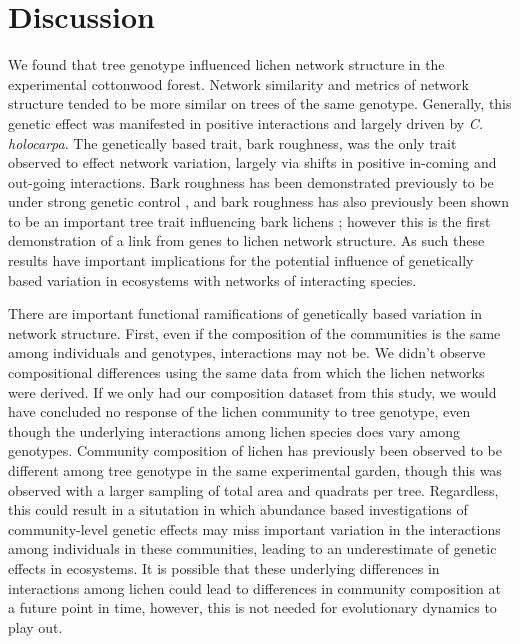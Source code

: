 \documentclass[11pt,twocolumn,twoside,lineno]{pnas-new}
\begin{document}


\section*{Discussion}


We found that tree genotype influenced lichen network structure in the
experimental cottonwood forest. Network similarity and metrics of
network structure tended to be more similar on trees of the same
genotype. Generally, this genetic effect was manifested in positive
interactions and largely driven by \textit{C. holocarpa}. The
genetically based trait, bark roughness, was the only trait observed
to effect network variation, largely via shifts in positive in-coming
and out-going interactions. Bark roughness has been demonstrated
previously to be under strong genetic control \cite{Bdeir2017}, and
bark roughness has also previously been shown to be an important tree
trait influencing bark lichens \cite{Lamit2015a}; however this is the
first demonstration of a link from genes to lichen network structure.
As such these results have important implications for the potential
influence of genetically based variation in ecosystems with networks
of interacting species.

There are important functional ramifications of genetically based
variation in network structure. First, even if the composition of the
communities is the same among individuals and genotypes, interactions
may not be. We didn't observe compositional differences using the same
data from which the lichen networks were derived. If we only had our
composition dataset from this study, we would have concluded no
response of the lichen community to tree genotype, even though the
underlying interactions among lichen species does vary among
genotypes. Community composition of lichen has previously been
observed to be different among tree genotype in the same experimental
garden, though this was observed with a larger sampling of total area
and quadrats per tree. Regardless, this could result in a situtation
in which abundance based investigations of community-level genetic
effects may miss important variation in the interactions among
individuals in these communities, leading to an underestimate of
genetic effects in ecosystems. It is possible that these underlying
differences in interactions among lichen could lead to differences in
community composition at a future point in time, however, this is not
needed for evolutionary dynamics to play out.
\end{document}
